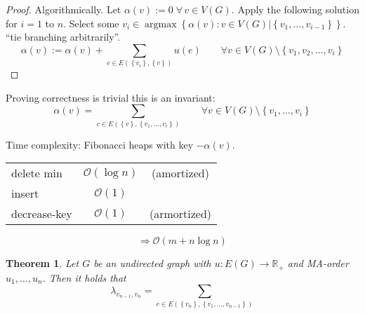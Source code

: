 \documentclass{article}
\newtheorem{theorem}{Theorem}
\newcommand{\set}[1]{\left\{#1\right\}}
\newcommand{\fall}{\;\forall\,}
\DeclareMathOperator{\argmax}{argmax}
\begin{document}
\begin{proof}
  Algorithmically. Let $\alpha(v) := 0 \fall v \in V(G)$. Apply the following solution for $i = 1$ to $n$.
  Select some $v_i \in \argmax{\set{\alpha(v): v \in V(G) | \set{v_1, \ldots, v_{i-1}}}}$.
  ``tie branching arbitrarily''.
  \[
    \alpha(v) := \alpha(v) + \sum_{e \in E(\set{v_i}, \set{v})} u(e)
      \qquad\forall v \in V(G) \setminus \set{v_1, v_2, \ldots, v_i}
  \]
\end{proof}

Proving correctness is trivial this is an invariant:
\[
  \alpha(v) = \sum_{c \in E(\set{v}, \set{v_1, \ldots, v_i})}
    \qquad \forall v \in V(G) \setminus \set{v_1, \ldots, v_i}
\]

Time complexity:
Fibonacci heaps with key $-\alpha(v)$.

\begin{center}
  \begin{tabular}{lcc}
    delete min   & $\mathcal{O}(\log{n})$ & (amortized) \\
    insert       & $\mathcal{O}(1)$       & \\
    decrease-key & $\mathcal{O}(1)$       & (armortized)
  \end{tabular}
  \[ \Rightarrow \mathcal{O}(m + n \log{n}) \]
\end{center}

\begin{theorem}\label{lemma-4.21}
  Let $G$ be an undirected graph with $u: E(G) \rightarrow \mathbb{R}_+$ and MA-order $u_1, \ldots, u_n$.
  Then it holds that
  \[
    \lambda_{v_{n-1}, v_n} = \sum_{e \in E(\set{v_n}, \set{v_1, \ldots, v_{n-1}})}
  \]
\end{theorem}
\end{document}
